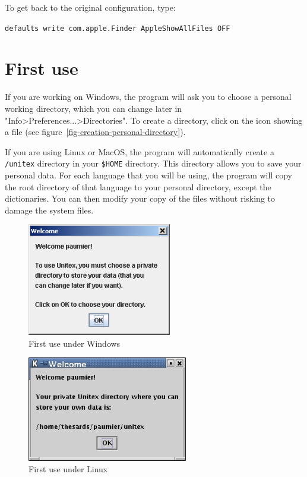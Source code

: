 \bigskip
\noindent To get back to the original configuration, type: 

\bigskip
\verb+defaults write com.apple.Finder AppleShowAllFiles OFF+


\section{First use}
If you are working on Windows, the program will ask you to choose a
 personal working  directory, which you can
change later in "Info>Preferences...>Directories". To create a directory, click
on the icon showing a file (see
figure~\ref{fig-creation-personal-directory}).

\bigskip
\noindent If you are using Linux or MacOS, the program will automatically create a
\verb+/unitex+ directory in your \verb+$HOME+ directory. This directory allows
you to save your personal data. For each language that you will be using, the
program will copy the root directory of that language to your personal
directory, except the dictionaries. You can then modify your copy of the
files without risking to damage the system files.

\begin{figure}[h]
\begin{center}
\includegraphics[width=6.3cm]{resources/img/fig1-1.png}
\caption{First use under Windows}
\end{center}
\end{figure}

\begin{figure}[h]
\begin{center}
\includegraphics[width=7cm]{resources/img/fig1-2.png}
\caption{First use under Linux}
\end{center}
\end{figure}

